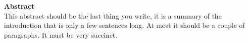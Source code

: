 \vspace*{\fill}
  \begin{center}
    \textbf{Abstract}\\
    This abstract should be the last thing you write, it is a summary of the introduction that is only a few sentences long.  At most it should be a couple of paragraphs. It must be very succinct.
  \end{center}
\vspace*{\fill}
\pagebreak
